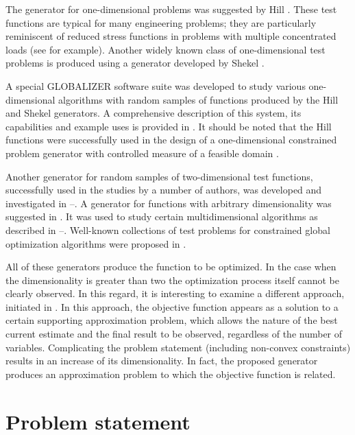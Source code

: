 \documentclass{llncs}
\begin{document}
The generator for one-dimensional problems was suggested by Hill \cite{Hill}. These test functions are typical for many engineering problems; they are particularly reminiscent of reduced stress functions in problems with multiple concentrated loads (see \cite{Toropov} for example). Another widely known class of one-dimensional test problems is produced using a generator developed by Shekel \cite{Shekel}. 

A special GLOBALIZER software suite \cite{Globalizer} was developed to study various one-dimensional algorithms with random samples of functions produced by the Hill and Shekel generators. A comprehensive description of this system, its capabilities and example uses is provided in \cite{Strongin2000}. It should be noted that the Hill functions were successfully used in the design of a one-dimensional constrained problem generator with controlled measure of a feasible domain \cite{Barkalov2002}.
 
Another generator for random samples of two-dimensional test functions, successfully used in the studies by a number of authors, was developed and investigated in \cite{Grishagin1997}--\cite{Grishagin2016}. A generator for functions with arbitrary dimensionality was suggested in \cite{Gaviano}. It was used to study certain multidimensional algorithms as described in \cite{Kvasov2006}--\cite{SergeyevKvasov2015}.
Well-known collections of test problems for constrained global optimization algorithms were proposed in \cite{Pardalos1990,Floudas1999}.

All of these generators produce the function to be optimized. In the case when the dimensionality is greater than two the optimization process itself cannot be clearly observed. In this regard, it is interesting to examine a different approach, initiated in \cite{Strongin2000}. In this approach, the objective function appears as a solution to a certain supporting approximation problem, which allows the nature of the best current estimate and the final result to be observed, regardless of the number of variables. Complicating the problem statement (including non-convex constraints) results in an increase of its dimensionality. In fact, the proposed generator produces an approximation problem to which the objective function is related.

\section{Problem statement}\label{Sec:2}
\end{document}
